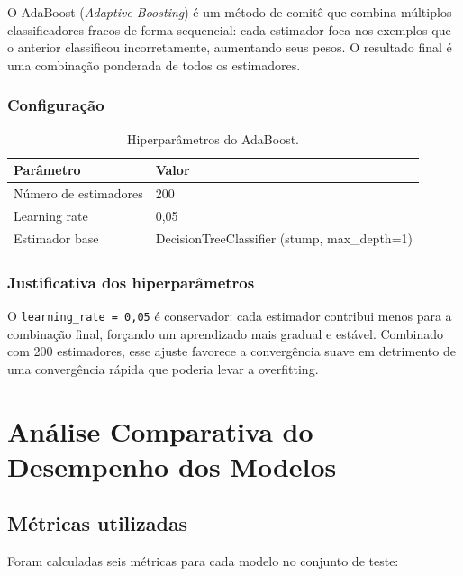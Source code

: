 \documentclass[12pt, a4paper]{article}
\begin{document}
O AdaBoost (\textit{Adaptive Boosting}) é um método de comitê que combina múltiplos
classificadores fracos de forma sequencial: cada estimador foca nos exemplos que o
anterior classificou incorretamente, aumentando seus pesos. O resultado final é uma
combinação ponderada de todos os estimadores.

\subsubsection{Configuração}

\begin{table}[H]
  \centering
  \caption{Hiperparâmetros do AdaBoost.}
  \begin{tabular}{ll}
    \toprule
    Parâmetro & Valor \\
    \midrule
    Número de estimadores & 200 \\
    Learning rate         & 0,05 \\
    Estimador base        & DecisionTreeClassifier (stump, max\_depth=1) \\
    \bottomrule
  \end{tabular}
  \label{tab:ada_params}
\end{table}

\subsubsection{Justificativa dos hiperparâmetros}

O \texttt{learning\_rate = 0{,}05} é conservador: cada estimador contribui menos
para a combinação final, forçando um aprendizado mais gradual e estável. Combinado
com 200 estimadores, esse ajuste favorece a convergência suave em detrimento de
uma convergência rápida que poderia levar a overfitting.

\section{Análise Comparativa do Desempenho dos Modelos}

\subsection{Métricas utilizadas}

Foram calculadas seis métricas para cada modelo no conjunto de teste:
\end{document}
